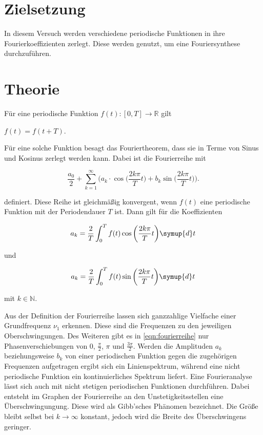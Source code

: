 \section{Zielsetzung}

In diesem Versuch werden verschiedene periodische Funktionen in ihre Fourierkoeffizienten zerlegt. Diese werden genutzt, um eine Fouriersynthese durchzuführen.

\section{Theorie}
\label{sec:Theorie}

Für eine periodische Funktion $f(t):[0, T] \rightarrow \mathds{R}$ gilt

\begin{center}
    $f(t) = f(t + T)$.
\end{center}

Für eine solche Funktion besagt das Fouriertheorem, dass sie in Terme von Sinus und Kosinus zerlegt werden kann.
Dabei ist die Fourierreihe mit

\begin{equation}
\label{eqn:fourierreihe}
    \frac{a_0}{2} + \sum_{k=1}^\infty \bigg( a_k \cdot \cos \bigg( \frac{2 k \pi}{T} t \bigg) + b_k \sin \bigg( \frac{2 k \pi}{T} t \bigg) \bigg).
\end{equation}

definiert. Diese Reihe ist gleichmäßig konvergent, wenn $f(t)$ eine periodische Funktion mit der Periodendauer $T$ ist. Dann gilt für die Koeffizienten

\begin{equation}
\label{eqn:ak}
    a_k = \frac{2}{T} \int_0^T f(t) \cos \bigg( \frac{2 k \pi}{T} t \bigg) \symup{d}t
\end{equation}

und

\begin{equation}
\label{eqn:bk}
    a_k = \frac{2}{T} \int_0^T f(t) \sin \bigg( \frac{2 k \pi}{T} t \bigg) \symup{d}t
\end{equation}

mit $k \in \mathds{N}$.

Aus der Definition der Fourierreihe lassen sich ganzzahlige Vielfache einer Grundfrequenz $\nu_1$ erkennen. Diese sind die Frequenzen zu den jeweiligen Oberschwingungen.
Des Weiteren gibt es in \eqref{eqn:fourierreihe} nur Phasenverschiebungen von $0$, $\frac{\pi}{2}$, $\pi$ und $\frac{3 \pi}{2}$.
Werden die Amplituden $a_k$ beziehungsweise $b_k$ von einer periodischen Funktion gegen die zugehörigen Frequenzen aufgetragen ergibt sich ein Linienspektrum, während eine nicht periodische Funktion ein kontinuierliches Spektrum liefert.
Eine Fourieranalyse lässt sich auch mit nicht stetigen periodischen Funktionen durchführen. Dabei entsteht im Graphen der Fourierreihe an den Unstetigkeitsstellen eine Überschwingungung. Diese wird als Gibb'sches Phänomen bezeichnet. Die Größe bleibt selbst bei $k \rightarrow \infty$ konstant, jedoch wird die Breite des Überschwingens geringer.

